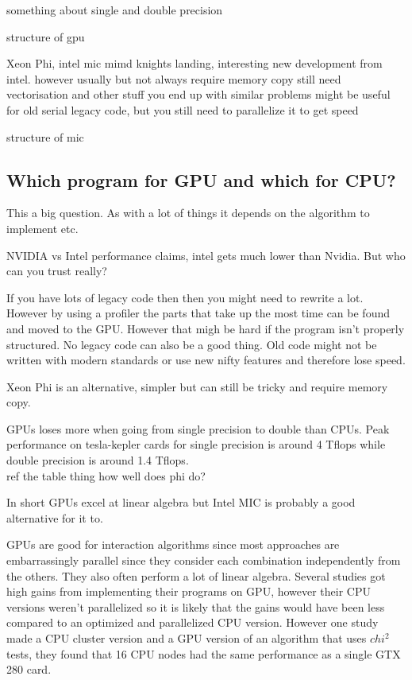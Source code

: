 \documentclass[10pt,a4paper]{report}
\begin{document}
something about single and double precision

structure of gpu

Xeon Phi, intel mic
mimd
knights landing, interesting new development from intel.
however usually but not always require memory copy
still need vectorisation and other stuff
you end up with similar problems
might be useful for old serial legacy code, but you still need to parallelize it to get speed

structure of mic

\subsection{Which program for GPU and which for CPU?}
\label{gpu_gwas}
This a big question. As with a lot of things it depends on the algorithm to implement etc.

NVIDIA vs Intel performance claims, intel gets much lower than Nvidia. But who can you trust really?

If you have lots of legacy code then then you might need to rewrite a lot. However by using a profiler the parts that take up the most time can be found and moved to the GPU. However that migh be hard if the program isn't properly structured. No legacy code can also be a good thing. Old code might not be written with modern standards or use new nifty features and therefore lose speed.

Xeon Phi is an alternative, simpler but can still be tricky and require memory copy.

GPUs loses more when going from single precision to double than CPUs. Peak performance on tesla-kepler cards for single precision is around 4 Tflops while double precision is around 1.4 Tflops. \cite{nvtesla}\\ ref the table thing how well does phi do?

In short GPUs excel at linear algebra but Intel MIC is probably a good alternative for it to.

GPUs are good for interaction algorithms since most approaches are embarrassingly parallel since they consider each combination independently from the others. They also often perform a lot of linear algebra. Several studies got high gains from implementing their programs on GPU, however their CPU versions weren't parallelized so it is likely that the gains would have been less compared to an optimized and parallelized CPU version.\cite{gwis,gboost,gmdr_gpu,cuda_lr,genie_2012,plink_gpu} However one study made a CPU cluster version and a GPU version of an algorithm that uses $chi^2$ tests, they found that 16 CPU nodes had the same performance as a single GTX 280 card\cite{jiang_accelerating}.
\end{document}
